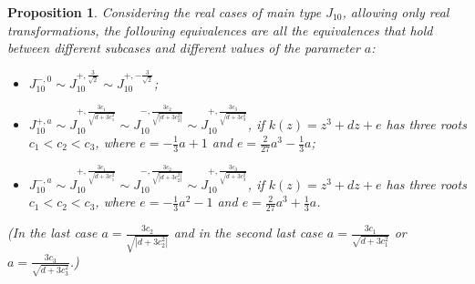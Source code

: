 \documentclass[noend]{amsproc}
\newtheorem{prop}[theorem]{Proposition}
\theoremstyle{definition}
\begin{document}
\begin{prop}
Considering the real cases of main type $J_{10}$, allowing only real transformations, the following equivalences are all the equivalences that hold between different subcases and different values of the parameter $a$:
\begin{itemize}
\item $ J_{10}^{-,0} \sim J_{10}^{+,\frac{3}{\sqrt{2}}}\sim J_{10}^{+,-\frac{3}{\sqrt{2}}}$;\\
\item $J_{10}^{+,a}\sim J_{10}^{+,\frac{3c_1}{\sqrt{d+3c_1^2}}}\sim J_{10}^{-,\frac{3c_2}{\sqrt{|d+3c_2^2|}}}\sim J_{10}^{+,\frac{3c_3}{\sqrt{d+3c_3^2}}}$, if $k(z)=z^3+dz+e$ has three roots $c_1<c_2<c_3$, where $e=-\frac{1}{3}a+1$ and $e=\frac{2}{27}a^3-\frac{1}{3}a$;\\
\item $J_{10}^{-,a}\sim J_{10}^{+,\frac{3c_1}{\sqrt{d+3c_1^2}}}\sim J_{10}^{-,\frac{3c_2}{\sqrt{|d+3c_2^2|}}}\sim J_{10}^{+,\frac{3c_3}{\sqrt{d+3c_3^2}}}$, if $k(z)=z^3+dz+e$ has three roots $c_1<c_2<c_3$, where $e=-\frac{1}{3}a^2-1$ and $e=\frac{2}{27}a^3+\frac{1}{3}a$.\\
\end{itemize}
(In the last case $a=\frac{3c_2}{\sqrt{|d+3c_2^2|}}$ and in the second last case $a=\frac{3c_1}{\sqrt{d+3c_1^2}}$ or $a=\frac{3c_3}{\sqrt{d+3c_3^2}}$.)
\end{prop}
\end{document}
